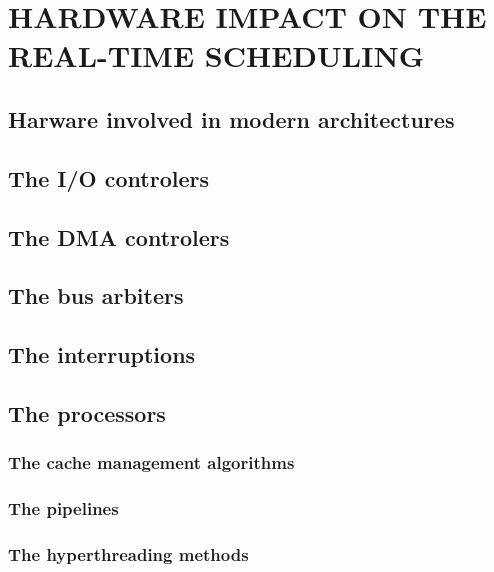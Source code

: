
\chapter{HARDWARE IMPACT ON THE REAL-TIME SCHEDULING}
\doMinitoc

\section{Harware involved in modern architectures}

\section{The I/O controlers}

\section{The DMA controlers}

\section{The bus arbiters}

\section{The interruptions}

\section{The processors}

\subsection{The cache management algorithms}

\subsection{The pipelines}

\subsection{The hyperthreading methods}

